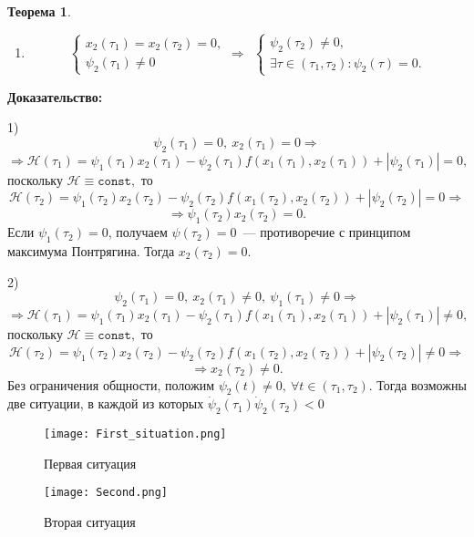\documentclass[a4paper,12pt]{article}
\newtheorem{thm}{Теорема}
\begin{document}
\begin{thm}
\begin{enumerate}
	\item
\begin{equation}\label{eq11}	
	\begin{cases}
		x_2(\tau_1) = x_2(\tau_2) = 0, \\
		\psi_2(\tau_1) \neq 0
	\end{cases} \Rightarrow \ \ 
	\begin{cases}
		\psi_2(\tau_2) \neq 0, \\
		\exists \tau \in (\tau_1, \tau_2): \psi_2(\tau) = 0.
	\end{cases} 
\end{equation}
\end{enumerate}

\end{thm}

\textbf{Доказательство:} 

1) 
\[ \psi_2(\tau_1) = 0, \ x_2(\tau_1) = 0 \Rightarrow \] 
\[ \Rightarrow \mathcal{H}(\tau_1) = \psi_1(\tau_1) x_2(\tau_1) - \psi_2(\tau_1) f(x_1(\tau_1), x_2(\tau_1)) + | \psi_2(\tau_1)| = 0,\]
поскольку $\mathcal{H} \equiv \texttt{const}, $ то
\[ \mathcal{H}(\tau_2) = \psi_1(\tau_2) x_2(\tau_2) - \psi_2(\tau_2) f(x_1(\tau_2), x_2(\tau_2)) + | \psi_2(\tau_2)| = 0 \Rightarrow \]
\[ \Rightarrow \psi_1(\tau_2)x_2(\tau_2) = 0.\]
Если $\psi_1(\tau_2) = 0$, получаем $\psi(\tau_2) = 0$~--- противоречие с принципом максимума Понтрягина. Тогда $x_2(\tau_2) = 0$. 

2)
\[ \psi_2(\tau_1) = 0, \ x_2(\tau_1) \neq 0, \ \psi_1(\tau_1) \neq 0 \Rightarrow \] 
\[ \Rightarrow \mathcal{H}(\tau_1) = \psi_1(\tau_1) x_2(\tau_1) - \psi_2(\tau_1) f(x_1(\tau_1), x_2(\tau_1)) + | \psi_2(\tau_1)| \neq 0,\]
поскольку $\mathcal{H} \equiv \texttt{const}, $ то
\[ \mathcal{H}(\tau_2) = \psi_1(\tau_2) x_2(\tau_2) - \psi_2(\tau_2) f(x_1(\tau_2), x_2(\tau_2)) + | \psi_2(\tau_2)| \neq 0 \Rightarrow \]
\[ \Rightarrow x_2(\tau_2) \neq 0.\]
Без ограничения общности, положим $\psi_2(t) \neq 0, \ \forall t \in (\tau_1, \tau_2).$ Тогда возможны две ситуации, в каждой из которых $\dot{\psi}_2(\tau_1)\dot{\psi}_2(\tau_2) < 0$
\begin{figure}[h]
\begin{minipage}[h]{0.47\linewidth}
\texttt{[image: First\_situation.png]}
\caption{Первая ситуация}
\end{minipage}
\hfill
\begin{minipage}[h]{0.47\linewidth}
\texttt{[image: Second.png]}
\caption{Вторая ситуация}
\end{minipage}
\end{figure}
\end{document}
